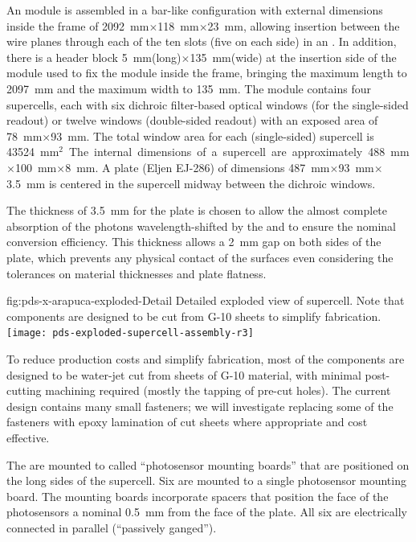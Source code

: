 An  module is assembled in a bar-like configuration with external dimensions inside the  frame of \SI{2092}{mm}$\times$\SI{118}{mm}$\times$\SI{23}{mm},  allowing insertion between the wire planes through each of the ten slots (five on each side) in an . In addition, there is a header block \SI{5}{mm}(long)$\times$\SI{135}{mm}(wide) at the insertion side of the module used to fix the module inside the  frame, bringing the maximum length to \SI{2097}{mm} and the maximum width to \SI{135}{mm}.
The module contains four  supercells, each with six dichroic filter-based optical windows (for the single-sided readout) or twelve windows (double-sided readout) with an exposed area of \SI{78}{mm}$\times$\SI{93}{mm}.  
The total window area for each (single-sided) supercell  is \SI{43524}{mm$^2$}.
The internal dimensions of a supercell are approximately \SI{488}{mm}$\times$\SI{100}{mm}$\times$\SI{8}{mm}. A  plate (Eljen EJ-286) of dimensions \SI{487}{mm}$\times$\SI{93}{mm}$\times$\SI{3.5}{mm} is centered in the supercell midway between the dichroic windows. 

The thickness of \SI{3.5}{mm} for the plate is chosen to allow the almost complete absorption of the photons wavelength-shifted by the  and to ensure the nominal conversion efficiency. This thickness allows a \SI{2}{mm}  gap on both sides of the plate, which prevents any physical contact of the surfaces even considering the tolerances on material thicknesses and plate flatness.   

\begin{dunefigure}{fig:pds-x-arapuca-exploded-Detail}
{Detailed exploded view of  supercell. Note that components are designed to be cut from \frfour G-10 sheets to simplify fabrication.}
   \texttt{[image: pds-exploded-supercell-assembly-r3]}
\end{dunefigure}

To reduce production costs and simplify fabrication, most of the  components are designed to be water-jet cut from sheets of \frfour G-10 material, with minimal post-cutting machining required (mostly the tapping of pre-cut holes).  The current design contains many small fasteners; we will investigate replacing some of the fasteners with epoxy lamination of cut sheets where appropriate and cost effective.


The  are mounted to  called ``photosensor mounting boards'' that  are positioned on the long sides of the supercell.  
Six  are mounted to a single photosensor mounting board.  The mounting boards incorporate spacers that position the face of the photosensors a nominal \SI{0.5}{mm} from the face of the  plate.  All six are electrically connected in parallel (``passively ganged'').

